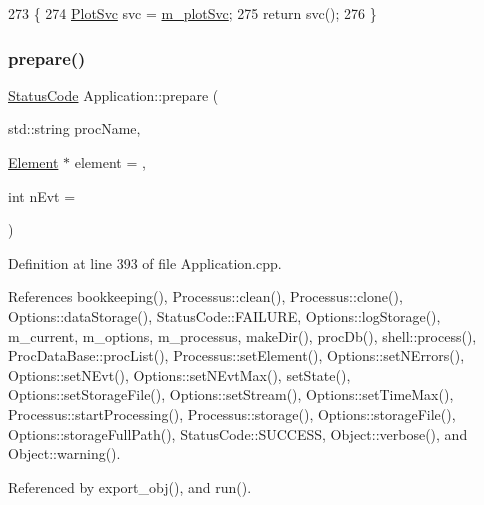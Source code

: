 \begin{DoxyCode}
273                         \{
274     \hyperlink{Application_8h_abaa10d33ca2837dfcf8ba9bff40cdbb6}{PlotSvc} svc = \hyperlink{classApplication_a30d5600ea5e4f36b14f25f903ee3256e}{m\_plotSvc};
275     \textcolor{keywordflow}{return} svc();
276   \}
\end{DoxyCode}
\mbox{\label{classApplication_a61dcc20b7f4b7c19b697db7516a62afa}} 
\subsubsection{\texorpdfstring{prepare()}{prepare()}}
{\footnotesize\ttfamily \hyperlink{classStatusCode}{Status\+Code} Application\+::prepare (\begin{DoxyParamCaption}\item[{std\+::string}]{proc\+Name,  }\item[{\hyperlink{classElement}{Element} $\ast$}]{element = {},  }\item[{int}]{n\+Evt = {} }\end{DoxyParamCaption})}



Definition at line 393 of file Application.\+cpp.



References bookkeeping(), Processus\+::clean(), Processus\+::clone(), Options\+::data\+Storage(), Status\+Code\+::\+F\+A\+I\+L\+U\+RE, Options\+::log\+Storage(), m\+\_\+current, m\+\_\+options, m\+\_\+processus, make\+Dir(), proc\+Db(), shell\+::process(), Proc\+Data\+Base\+::proc\+List(), Processus\+::set\+Element(), Options\+::set\+N\+Errors(), Options\+::set\+N\+Evt(), Options\+::set\+N\+Evt\+Max(), set\+State(), Options\+::set\+Storage\+File(), Options\+::set\+Stream(), Options\+::set\+Time\+Max(), Processus\+::start\+Processing(), Processus\+::storage(), Options\+::storage\+File(), Options\+::storage\+Full\+Path(), Status\+Code\+::\+S\+U\+C\+C\+E\+SS, Object\+::verbose(), and Object\+::warning().



Referenced by export\+\_\+obj(), and run().


